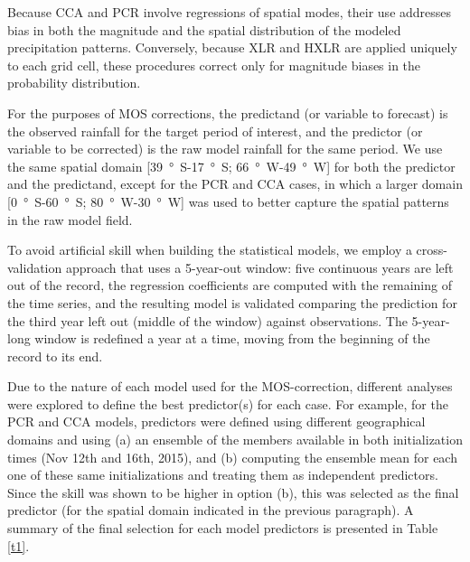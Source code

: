 \documentclass[twocol]{ametsoc}
\begin{document}
Because CCA and PCR involve regressions of spatial modes, their use addresses bias in both the magnitude and the spatial distribution of the modeled precipitation patterns. Conversely, because XLR and HXLR are applied uniquely to each grid cell, these procedures correct only for magnitude biases in the probability distribution.

For the purposes of MOS corrections, the predictand (or variable to forecast) is the observed rainfall for the target period of interest, and the predictor (or variable to be corrected) is the raw model rainfall for the same period.
We use the same spatial domain [\SI{39}{\degree S}-\SI{17}{\degree S}; \SI{66}{\degree W}-\SI{49}{\degree W}] for both the predictor and the predictand, except for the PCR and CCA cases, in which a larger domain [\SI{0}{\degree S}-\SI{60}{\degree S}; \SI{80}{\degree W}-\SI{30}{\degree W}] was used to better capture the spatial patterns in the raw model field.

To avoid artificial skill when building the statistical models, we employ a cross-validation approach that uses a 5-year-out window: five continuous years are left out of the record, the regression coefficients are computed with the remaining of the time series, and the resulting model is validated comparing the prediction for the third year left out (middle of the window) against observations.
The 5-year-long window is redefined a year at a time, moving from the beginning of the record to its end.

Due to the nature of each model used for the MOS-correction, different analyses were explored to define the best predictor(s) for each case.
For example, for the PCR and CCA models, predictors were defined using different geographical domains and using (a) an ensemble of the members available in both initialization times (Nov 12th and 16th, 2015), and (b) computing the ensemble mean for each one of these same initializations and treating them as independent predictors.
Since the skill was shown to be higher in option (b), this was selected as the final predictor (for the spatial domain indicated in the previous paragraph).
A summary of the final selection for each model predictors is presented in Table \ref{t1}.
\end{document}
